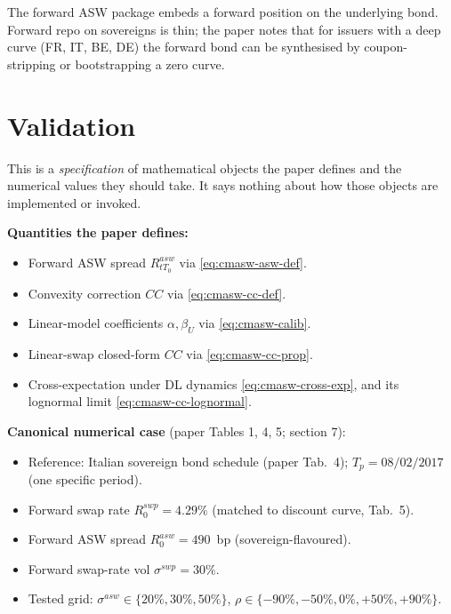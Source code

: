 \documentclass[11pt,a4paper]{article}
\begin{document}
\begin{commentary}
The forward ASW package embeds a forward position on the underlying
bond. Forward repo on sovereigns is thin; the paper notes that for
issuers with a deep curve (FR, IT, BE, DE) the forward bond can be
synthesised by coupon-stripping or bootstrapping a zero curve.
\end{commentary}

\section{Validation}

\begin{validation}
This is a \emph{specification} of mathematical objects the paper
defines and the numerical values they should take. It says nothing
about how those objects are implemented or invoked.

\textbf{Quantities the paper defines:}
\begin{itemize}[noitemsep]
  \item Forward ASW spread $R^{asw}_{t T_0}$ via
        \eqref{eq:cmasw-asw-def}.
  \item Convexity correction $CC$ via \eqref{eq:cmasw-cc-def}.
  \item Linear-model coefficients $\alpha, \beta_U$ via
        \eqref{eq:cmasw-calib}.
  \item Linear-swap closed-form $CC$ via \eqref{eq:cmasw-cc-prop}.
  \item Cross-expectation under DL dynamics
        \eqref{eq:cmasw-cross-exp}, and its lognormal limit
        \eqref{eq:cmasw-cc-lognormal}.
\end{itemize}

\textbf{Canonical numerical case} (paper Tables 1, 4, 5; section 7):
\begin{itemize}[noitemsep]
  \item Reference: Italian sovereign bond schedule (paper Tab.~4);
        $T_p = 08/02/2017$ (one specific period).
  \item Forward swap rate $R^{swp}_0 = 4.29\%$ (matched to discount
        curve, Tab.~5).
  \item Forward ASW spread $R^{asw}_0 = 490$~bp (sovereign-flavoured).
  \item Forward swap-rate vol $\sigma^{swp} = 30\%$.
  \item Tested grid: $\sigma^{asw} \in \{20\%, 30\%, 50\%\}$,
        $\rho \in \{-90\%, -50\%, 0\%, +50\%, +90\%\}$.
\end{itemize}


\end{validation}
\end{document}
